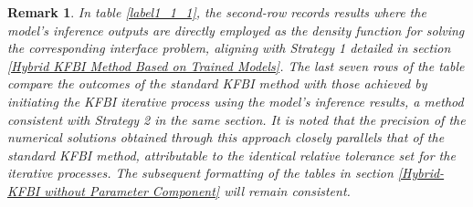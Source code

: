 \documentclass{article}
\newtheorem{remark}{Remark}
\begin{document}
\begin{remark}
In table \ref{label1_1_1}, the second-row records results where the model's inference outputs are directly employed as the density function for solving the corresponding interface problem, aligning with Strategy 1 detailed in section \ref{Hybrid KFBI Method Based on Trained Models}. The last seven rows of the table compare the outcomes of the standard KFBI method with those achieved by initiating the KFBI iterative process using the model's inference results, a method consistent with Strategy 2 in the same section. It is noted that the precision of the numerical solutions obtained through this approach closely parallels that of the standard KFBI method, attributable to the identical relative tolerance set for the iterative processes. The subsequent formatting of the tables in section \ref{Hybrid-KFBI without Parameter Component} will remain consistent.
\end{remark}


\end{document}
